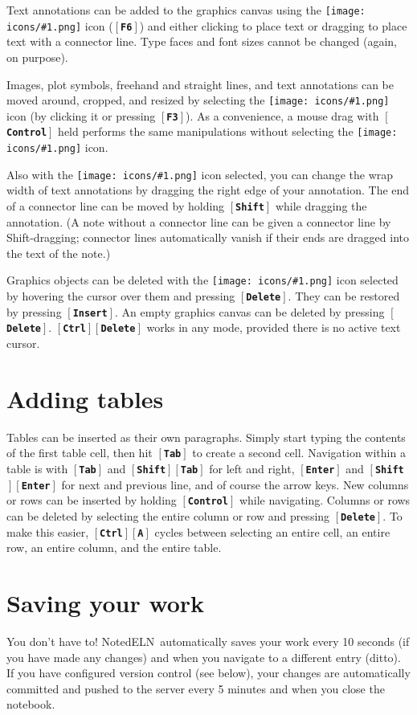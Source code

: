 \documentclass[11pt]{report}
\def\keystroke#1{$\left[\right.\!${\tt\bfseries #1}$\!\left.\right]$}
\def\key#1{\keystroke{#1}}
\def\keycombo#1#2{\keystroke{#1}\keystroke{#2}}
\def\keycontrol#1{\keycombo{Ctrl}{#1}}
\def\keyshift#1{\keycombo{Shift}{#1}}
\def\icon#1{\raise-2pt\hbox{\texttt{[image: icons/\#1.png]}}}
\newcommand{\NotedELN}{NotedELN} %
\begin{document}
Text annotations can be added to the graphics canvas using the
\icon{note} icon (\key{F6}) and either clicking to place text or
dragging to place text with a connector line. Type faces and font
sizes cannot be changed (again, on purpose).

Images, plot symbols, freehand and straight lines, and text
annotations can be moved around, cropped, and resized by selecting the
\icon{move} icon (by clicking it or pressing \key{F3}). As a
convenience, a mouse drag with \key{Control} held performs the same
manipulations without selecting the \icon{move} icon.

Also with the \icon{move} icon selected, you can change
the wrap width of text annotations by dragging the right edge of your
annotation. The end of a connector line can be moved by holding
\key{Shift} while dragging the annotation. (A note without a connector
line can be given a connector line by Shift-dragging; connector lines
automatically vanish if their ends are dragged into the text of the
note.)

Graphics objects can be deleted with the \icon{move} icon selected by
hovering the cursor over them and pressing \key{Delete}. They can be
restored by pressing \key{Insert}. An empty graphics canvas can be
deleted by pressing \key{Delete}. \keycontrol{Delete} works in any
mode, provided there is no active text cursor.

\section{Adding tables}

Tables can be inserted as their own paragraphs. Simply start typing
the contents of the first table cell, then hit \key{Tab} to create a
second cell. Navigation within a table is with \key{Tab} and
\keyshift{Tab} for left and right, \key{Enter} and \keyshift{Enter}
for next and previous line, and of course the arrow keys. New columns
or rows can be inserted by holding \key{Control} while
navigating. Columns or rows can be deleted by selecting the entire
column or row and pressing \key{Delete}. To make this easier,
\keycontrol{A} cycles between selecting an entire cell, an entire row,
an entire column, and the entire table.

\section{Saving your work}

You don't have to! \NotedELN\ automatically saves your work every 10 seconds
(if you have made any changes) and when you navigate to a different
entry (ditto). If you have configured version control (see below),
your changes are automatically committed and pushed to the server
every 5 minutes and when you close the notebook.
\end{document}
